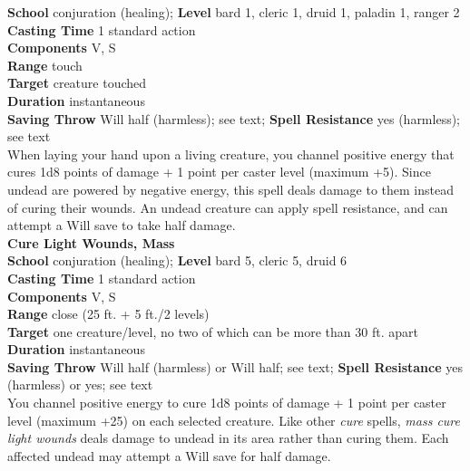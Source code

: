 \textbf{School} conjuration (healing); \textbf{Level} bard 1, cleric 1, druid 1, paladin 1, ranger 2\\
\textbf{Casting Time} 1 standard action\\
\textbf{Components} V, S\\
\textbf{Range} touch\\
\textbf{Target} creature touched\\
\textbf{Duration} instantaneous\\
\textbf{Saving Throw }Will half (harmless); see text; \textbf{Spell Resistance} yes (harmless); see text\\
When laying your hand upon a living creature, you channel positive energy that cures 1d8 points of damage + 1 point per caster level (maximum +5). Since undead are powered by negative energy, this spell deals damage to them instead of curing their wounds. An undead creature can apply spell resistance, and can attempt a Will save to take half damage.\\
\textbf{Cure Light Wounds, Mass}\\
\textbf{School} conjuration (healing); \textbf{Level} bard 5, cleric 5, druid 6\\
\textbf{Casting Time} 1 standard action\\
\textbf{Components} V, S\\
\textbf{Range} close (25 ft. + 5 ft./2 levels)\\
\textbf{Target} one creature/level, no two of which can be more than 30 ft. apart\\
\textbf{Duration} instantaneous\\
\textbf{Saving Throw }Will half (harmless) or Will half; see text; \textbf{Spell Resistance} yes (harmless) or yes; see text\\
You channel positive energy to cure 1d8 points of damage + 1 point per caster level (maximum +25) on each selected creature. Like other \textit{cure }spells, \textit{mass cure light wounds }deals damage to undead in its area rather than curing them. Each affected undead may attempt a Will save for half damage.\\
